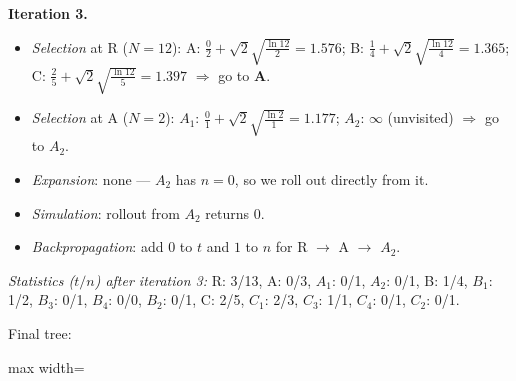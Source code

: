 \documentclass[11pt,a4paper]{article}
\begin{document}
\begin{solbox}
\smallskip
\textbf{Iteration 3.}
\begin{itemize}[leftmargin=1.5em,itemsep=1pt]
\item \emph{Selection} at R ($N=12$): A: $\frac{0}{2} + \sqrt2\sqrt{\frac{\ln 12}{2}} = 1.576$; B: $\frac{1}{4} + \sqrt2\sqrt{\frac{\ln 12}{4}} = 1.365$; C: $\frac{2}{5} + \sqrt2\sqrt{\frac{\ln 12}{5}} = 1.397$ $\Rightarrow$ go to \textbf{A}.
\item \emph{Selection} at A ($N=2$): $A_{1}$: $\frac{0}{1} + \sqrt2\sqrt{\frac{\ln 2}{1}} = 1.177$; $A_{2}$: $\infty$ (unvisited) $\Rightarrow$ go to \textbf{$A_{2}$}.
\item \emph{Expansion}: none --- \textbf{$A_{2}$} has $n=0$, so we roll out directly from it.
\item \emph{Simulation}: rollout from $A_{2}$ returns $0$.
\item \emph{Backpropagation}: add $0$ to $t$ and $1$ to $n$ for R $\to$ A $\to$ $A_{2}$.
\end{itemize}
\textit{Statistics ($t/n$) after iteration 3:} R: 3/13, A: 0/3, $A_{1}$: 0/1, $A_{2}$: 0/1, B: 1/4, $B_{1}$: 1/2, $B_{3}$: 0/1, $B_{4}$: 0/0, $B_{2}$: 0/1, C: 2/5, $C_{1}$: 2/3, $C_{3}$: 1/1, $C_{4}$: 0/1, $C_{2}$: 0/1.\par Final tree:\begin{center}
\begin{adjustbox}{max width=\linewidth}
\end{adjustbox}
\end{center}
\end{solbox}
\end{document}
